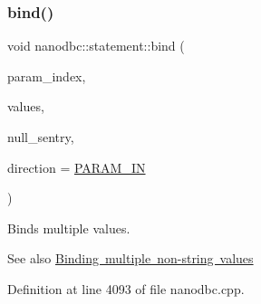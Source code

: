 \subsubsection{\texorpdfstring{bind()}{bind()}\hspace{0.1cm}{\footnotesize\ttfamily [6/6]}}
{\footnotesize\ttfamily void nanodbc\+::statement\+::bind (\begin{DoxyParamCaption}\item[{short}]{param\+\_\+index,  }\item[{std\+::vector$<$ std\+::vector$<$ uint8\+\_\+t $>$$>$ const \&}]{values,  }\item[{uint8\+\_\+t const $\ast$}]{null\+\_\+sentry,  }\item[{\mbox{\hyperlink{classnanodbc_1_1statement_a523142f53cbbee8d68a074da993e7fa6}{param\+\_\+direction}}}]{direction = {\ttfamily \mbox{\hyperlink{classnanodbc_1_1statement_a523142f53cbbee8d68a074da993e7fa6ae33f42ce0677d00c291ff4d8e39f99de}{P\+A\+R\+A\+M\+\_\+\+IN}}} }\end{DoxyParamCaption})}



Binds multiple values. 

\begin{DoxySeeAlso}{See also}
\mbox{\hyperlink{group__bind__multi}{Binding multiple non-\/string values}} 
\end{DoxySeeAlso}


Definition at line 4093 of file nanodbc.\+cpp.

